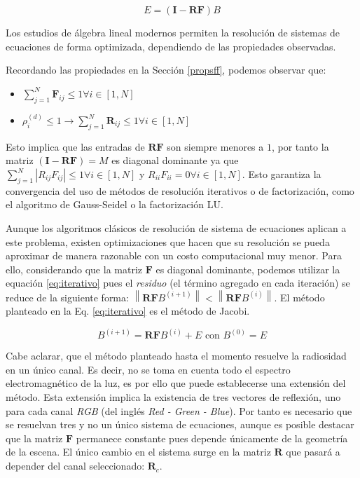\begin{equation}
	E = (\mathbf{I} - \mathbf{RF})B
\end{equation}

Los estudios de álgebra lineal modernos permiten la resolución de sistemas de ecuaciones de forma optimizada, dependiendo de las propiedades observadas.

Recordando las propiedades en la Sección \ref{propsff}, podemos observar que:

\begin{itemize}
	\item $\sum_{j=1}^{N} \mathbf{F}_{ij} \leq 1 \forall{i \in [1,N]}$
	\item $\rho^{(d)}_{i} \leq 1 \rightarrow \sum_{j=1}^{N} \mathbf{R}_{ij} \leq 1 \forall{i \in [1,N]}$
\end{itemize}

Esto implica que las entradas de $\mathbf{RF}$ s\texttt{}on siempre menores a $1$, por tanto la matriz $(\mathbf{I} - \mathbf{RF}) = M$ es diagonal dominante ya que $\sum_{j=1}^{N}|R_{ij}F_{ij}| \le 1 \forall i \in [1, N]$ y $R_{ii}F_{ii} = 0  \forall  i \in [1,N]$. Esto garantiza la convergencia del uso de métodos de resolución iterativos o de factorización, como el algoritmo de Gauss-Seidel o la factorización LU.

Aunque los algoritmos clásicos de resolución de sistema de ecuaciones aplican a este problema, existen optimizaciones que hacen que su resolución se pueda aproximar de manera razonable con un costo computacional muy menor. Para ello, considerando que la matriz $\mathbf{F}$ es diagonal dominante, podemos utilizar la equación \ref{eq:iterativo} pues el \textit{residuo} (el término agregado en cada iteración) se reduce de la siguiente forma: $\left\|\mathbf{RF}B^{(i+1)}\right\| < \left\|\mathbf{RF}B^{(i)}\right\|$. El método planteado en la Eq. \eqref{eq:iterativo} es el método de Jacobi.

\begin{equation}
	B^{(i+1)}  = \mathbf{RF}B^{(i)}  + E \text{ con }  B^{(0)} = E
	\label{eq:iterativo}
\end{equation}

Cabe aclarar, que el método planteado hasta el momento resuelve la radiosidad en un único canal. Es decir, no se toma en cuenta todo el espectro electromagnético de la luz, es por ello que puede establecerse una extensión del método. Esta extensión implica la existencia de tres vectores de reflexión, uno para cada canal \textit{RGB} (del inglés \textit{Red - Green - Blue}). Por tanto es necesario que se resuelvan tres y no un único sistema de ecuaciones, aunque es posible destacar que la matriz $\mathbf{F}$ permanece constante pues depende únicamente de la geometría de la escena. El único cambio en el sistema surge en la matriz $\mathbf{R}$ que pasará a depender del canal seleccionado: $\mathbf{R}_{c}$.

